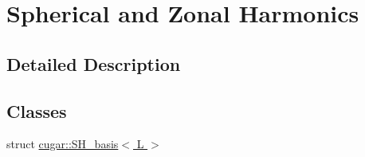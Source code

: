 \hypertarget{group__spherical__harmonics}{}\section{Spherical and Zonal Harmonics}
\label{group__spherical__harmonics}


\subsection{Detailed Description}
\subsection*{Classes}
\begin{DoxyCompactItemize}
\item 
struct \hyperlink{structcugar_1_1_s_h__basis}{cugar\+::\+S\+H\+\_\+basis$<$ L $>$}
\end{DoxyCompactItemize}
